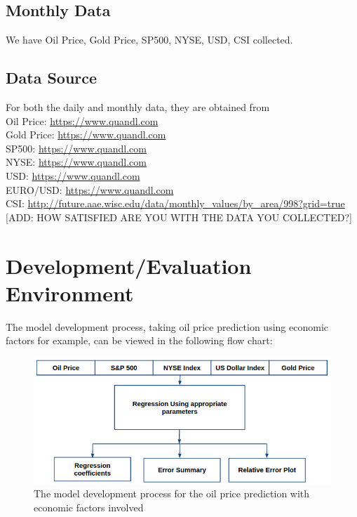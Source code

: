 \documentclass[runningheads]{llncs}
\begin{document}
\subsection{Monthly Data} We have Oil Price, Gold Price, SP500, NYSE, USD, CSI collected. \\

\subsection{Data Source}
\noindent For both the daily and monthly data, they are obtained from \\
Oil Price: \url{https://www.quandl.com} \\ 
Gold Price: \url{https://www.quandl.com} \\
SP500: \url{https://www.quandl.com} \\
NYSE: \url{https://www.quandl.com} \\
USD: \url{https://www.quandl.com} \\
EURO/USD: \url{https://www.quandl.com} \\
CSI: \url{http://future.aae.wisc.edu/data/monthly_values/by_area/998?grid=true} \\

[ADD: HOW SATISFIED ARE YOU WITH THE DATA YOU COLLECTED?]

\section{Development/Evaluation Environment}

The model development process, taking oil price prediction using economic factors for example, can be viewed in the following flow chart: \\

\begin{figure}
\centering
\includegraphics[width=\textwidth]{DevelopmentFlowchart.png}
\caption{The model development process for the oil price prediction with economic factors involved}
\label{fig:DevelopmentFlowchart.png}
\end{figure}
\end{document}
